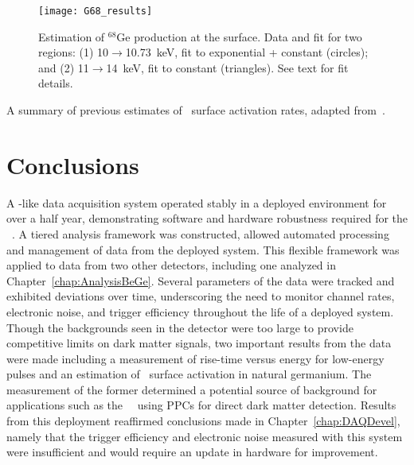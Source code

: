			\begin{figure}
				\centering
				\texttt{[image: G68\_results]}
				\caption[Estimation of $^{68}$Ge production at the surface]
				{Estimation of $^{68}$Ge production at the surface.  Data and fit for two regions:
				(1) 10$\to$10.73~keV, fit to exponential + constant (circles); and (2) 11$\to$14~keV, 
				fit to constant (triangles).  See text for fit details.}
				\label{fig:GE68Production}
			\end{figure}			
			
	          
	          	\begin{table}
				\caption[Summary of previous estimates of \gersixeight~surface activation rates]
				{A summary of previous estimates of \gersixeight~surface activation rates, 
				adapted from~\cite{Elliott:2009cw}.}
				\label{tab:Ge68PreviousResults}
	          	\end{table}			
			
	\section{Conclusions}
	
	A \MJ-like data acquisition system operated stably in a deployed environment for over a half year, demonstrating software and hardware robustness required for the \MJ~\minmod.  A tiered analysis framework was constructed, allowed automated processing and management of data from the deployed system.  This flexible framework was applied to data from two other detectors, including one analyzed in Chapter~\ref{chap:AnalysisBeGe}.  Several parameters of the data were tracked and exhibited deviations over time, underscoring the need to monitor channel rates, electronic noise, and trigger efficiency throughout the life of a deployed system.  Though the backgrounds seen in the detector were too large to provide competitive limits on dark matter signals, two important results from the data were made including a measurement of rise-time versus energy for low-energy pulses and an estimation of \gersixeight~surface activation in natural germanium.  The measurement of the former determined a potential source of background for applications such as the \MJ~\minmod~using PPCs for direct dark matter detection.  Results from this deployment reaffirmed conclusions made in Chapter~\ref{chap:DAQDevel}, namely that the trigger efficiency and electronic noise measured with this system were insufficient and would require an update in hardware for improvement.

